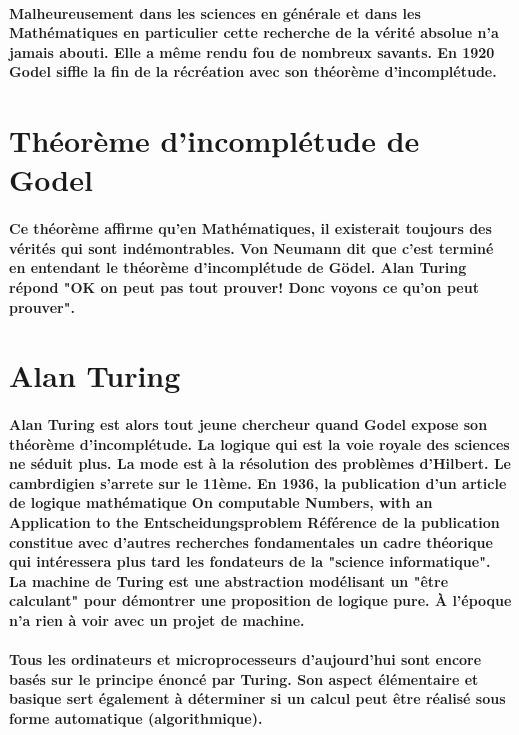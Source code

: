 \documentclass[a4paper, 11pt]{book}
\begin{document}
\paragraph{
  Malheureusement dans les sciences en générale et dans les Mathématiques en particulier cette recherche de la vérité absolue n'a jamais abouti. Elle a même rendu fou de nombreux savants. En 1920 Godel siffle la fin de la récréation avec son théorème d'incomplétude.
}

\section*{ Théorème d'incomplétude de Godel }

\paragraph{
  Ce théorème affirme qu'en Mathématiques, il existerait toujours des vérités qui sont indémontrables. Von Neumann dit que c'est terminé en entendant le théorème d'incomplétude de Gödel. Alan Turing répond "OK on peut pas tout prouver! Donc voyons ce qu'on peut prouver".
}

\section*{ Alan Turing }

\paragraph{
  Alan Turing est alors tout jeune chercheur quand Godel expose son théorème d'incomplétude. La logique qui est la voie royale des sciences ne séduit plus. La mode est à la résolution des problèmes d'Hilbert. Le cambrdigien s'arrete sur le 11ème. En 1936, la publication d'un article de logique mathématique On computable Numbers, with an Application to the Entscheidungsproblem Référence de la publication constitue avec d'autres recherches fondamentales un cadre théorique qui intéressera plus tard les fondateurs de la "science informatique". La machine de Turing est une abstraction modélisant un "être calculant" pour démontrer une proposition de logique pure. À l'époque n'a rien à voir avec un projet de machine.
}

\paragraph{
  Tous les ordinateurs et microprocesseurs d'aujourd'hui sont encore basés sur le principe énoncé par Turing. Son aspect élémentaire et basique sert également à déterminer si un calcul peut être réalisé sous forme automatique (algorithmique).
}
\end{document}
